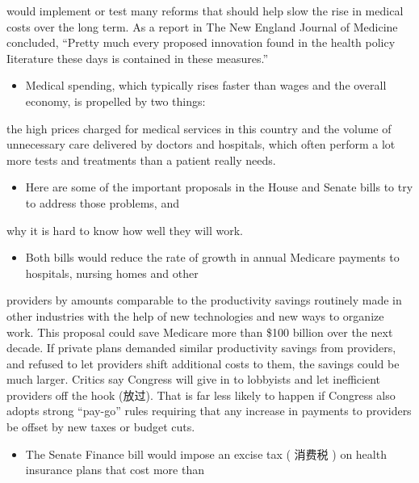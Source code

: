\documentclass[UTF8,11pt]{ctexart}
\begin{document}
would implement or test many reforms that should help slow the rise in medical costs over the long term. As a report in The New England Journal of Medicine concluded, “Pretty much every proposed innovation found in the health policy Iiterature these days is contained in these measures.”


\begin{itemize}[leftmargin=2em,itemsep=.2em,topsep=.4em]\item[C.] Medical spending, which typically rises faster than wages and the overall economy, is propelled by two things:
\end{itemize}

the high prices charged for medical services in this country and the volume of unnecessary care delivered by doctors and hospitals, which often perform a lot more tests and treatments than a patient really needs.


\begin{itemize}[leftmargin=2em,itemsep=.2em,topsep=.4em]\item[D.] Here are some of the important proposals in the House and Senate bills to try to address those problems, and
\end{itemize}

why it is hard to know how well they will work.


\begin{itemize}[leftmargin=2em,itemsep=.2em,topsep=.4em]\item[E.] Both bills would reduce the rate of growth in annual Medicare payments to hospitals, nursing homes and other
\end{itemize}

providers by amounts comparable to the productivity savings routinely made in other industries with the help of new technologies and new ways to organize work. This proposal could save Medicare more than \$100 billion over the next decade. If private plans demanded similar productivity savings from providers, and refused to let providers shift additional costs to them, the savings could be much larger. Critics say Congress will give in to lobbyists and let inefficient providers off the hook (放过). That is far less likely to happen if Congress also adopts strong “pay-go” rules requiring that any increase in payments to providers be offset by new taxes or budget cuts.


\begin{itemize}[leftmargin=2em,itemsep=.2em,topsep=.4em]\item[F.] The Senate Finance bill would impose an excise tax ( 消费税 ) on health insurance plans that cost more than
\end{itemize}
\end{document}
